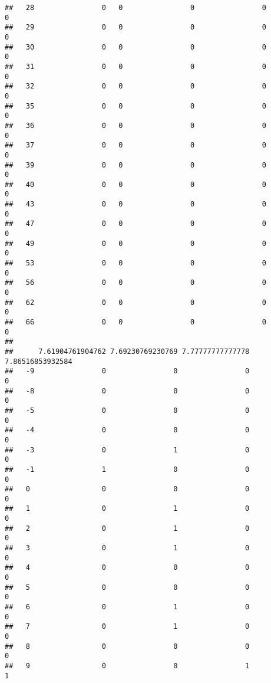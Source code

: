 \documentclass[]{article}
\begin{document}
\begin{verbatim}
##   28                0   0                0                0                0
##   29                0   0                0                0                0
##   30                0   0                0                0                0
##   31                0   0                0                0                0
##   32                0   0                0                0                0
##   35                0   0                0                0                0
##   36                0   0                0                0                0
##   37                0   0                0                0                0
##   39                0   0                0                0                0
##   40                0   0                0                0                0
##   43                0   0                0                0                0
##   47                0   0                0                0                0
##   49                0   0                0                0                0
##   53                0   0                0                0                0
##   56                0   0                0                0                0
##   62                0   0                0                0                0
##   66                0   0                0                0                0
##     
##      7.61904761904762 7.69230769230769 7.77777777777778 7.86516853932584
##   -9                0                0                0                0
##   -8                0                0                0                0
##   -5                0                0                0                0
##   -4                0                0                0                0
##   -3                0                1                0                0
##   -1                1                0                0                0
##   0                 0                0                0                0
##   1                 0                1                0                0
##   2                 0                1                0                0
##   3                 0                1                0                0
##   4                 0                0                0                0
##   5                 0                0                0                0
##   6                 0                1                0                0
##   7                 0                1                0                0
##   8                 0                0                0                0
##   9                 0                0                1                1

\end{verbatim}
\end{document}
